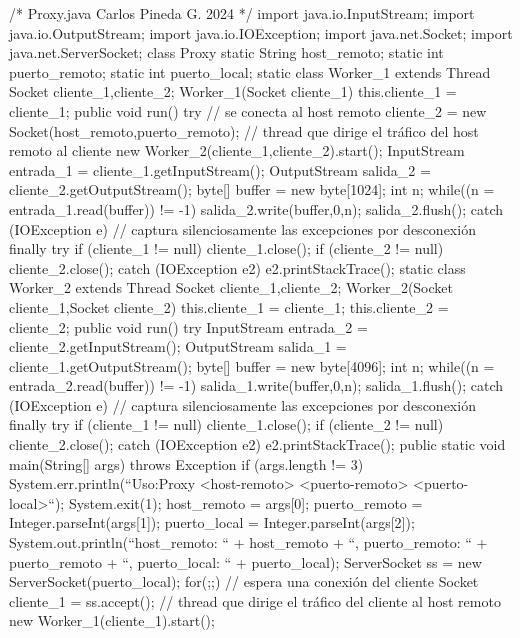 \begin{SourceCode}
/*
  Proxy.java
  Carlos Pineda G. 2024
*/
import java.io.InputStream;
import java.io.OutputStream;
import java.io.IOException;
import java.net.Socket;
import java.net.ServerSocket;
class Proxy
{
  static String host_remoto;
  static int puerto_remoto;
  static int puerto_local;
  static class Worker_1 extends Thread
  {
    Socket cliente_1,cliente_2;
    Worker_1(Socket cliente_1)
    {
      this.cliente_1 = cliente_1;
    }
    public void run()
    {
      try
      {
        // se conecta al host remoto
        cliente_2 = new Socket(host_remoto,puerto_remoto);
        // thread que dirige el tráfico del host remoto al cliente
        new Worker_2(cliente_1,cliente_2).start();
        InputStream entrada_1 = cliente_1.getInputStream();
        OutputStream salida_2 = cliente_2.getOutputStream();
        byte[] buffer = new byte[1024];
        int n;
        while((n = entrada_1.read(buffer)) != -1)
        {
          salida_2.write(buffer,0,n);
          salida_2.flush();
        }
      }
      catch (IOException e)
      {
        // captura silenciosamente las excepciones por desconexión
      }
      finally
      {
        try
        {
          if (cliente_1 != null) cliente_1.close();
          if (cliente_2 != null) cliente_2.close();
        }
        catch (IOException e2)
        {
          e2.printStackTrace();
        }
      }
    }
  }
  static class Worker_2 extends Thread
  {
    Socket cliente_1,cliente_2;
    Worker_2(Socket cliente_1,Socket cliente_2)
    {
      this.cliente_1 = cliente_1;
      this.cliente_2 = cliente_2;
    }
    public void run()
    {
      try
      {
        InputStream entrada_2 = cliente_2.getInputStream();
        OutputStream salida_1 = cliente_1.getOutputStream();
        byte[] buffer = new byte[4096];
        int n;
        while((n = entrada_2.read(buffer)) != -1)
        {
          salida_1.write(buffer,0,n);
          salida_1.flush();
        } 
      }
      catch (IOException e)
      {
        // captura silenciosamente las excepciones por desconexión
      }
      finally
      {
        try
        {
          if (cliente_1 != null) cliente_1.close();
          if (cliente_2 != null) cliente_2.close();
        }
        catch (IOException e2)
        {
          e2.printStackTrace();
        }
      }
    }
  }
  public static void main(String[] args) throws Exception
  {
    if (args.length != 3)
    { 
      System.err.println(``Uso:\njava Proxy <host-remoto> <puerto-remoto> <puerto-local>``);
      System.exit(1);
    }
    host_remoto = args[0];
    puerto_remoto = Integer.parseInt(args[1]);
    puerto_local = Integer.parseInt(args[2]);
    System.out.println(``host_remoto: `` + host_remoto + ``, puerto_remoto: `` + puerto_remoto + ``, puerto_local: `` + puerto_local);
    ServerSocket ss = new ServerSocket(puerto_local);
    for(;;)
    {
      // espera una conexión del cliente
      Socket cliente_1 = ss.accept();
      // thread que dirige el tráfico del cliente al host remoto
      new Worker_1(cliente_1).start();
    }
  }
}
\end{SourceCode}

